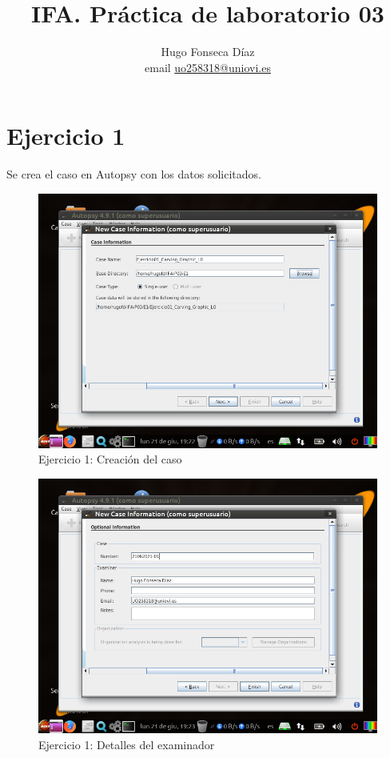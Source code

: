 \documentclass[11pt]{article}
\begin{document}
\title{IFA. Práctica de laboratorio 03}

\author{Hugo Fonseca Díaz \\ email \href{mailto:uo258318@uniovi.es}{uo258318@uniovi.es}}

\maketitle

\section{Ejercicio 1}
Se crea el caso en Autopsy con los datos solicitados.

\begin{figure}[H]
  \caption{Ejercicio 1: Creación del caso}
  \centering
  \includegraphics[scale=0.7]{e1-1.png}
\end{figure}

\begin{figure}[H]
  \caption{Ejercicio 1: Detalles del examinador}
  \centering
  \includegraphics[scale=0.7]{e1-2.png}
\end{figure}
\end{document}
